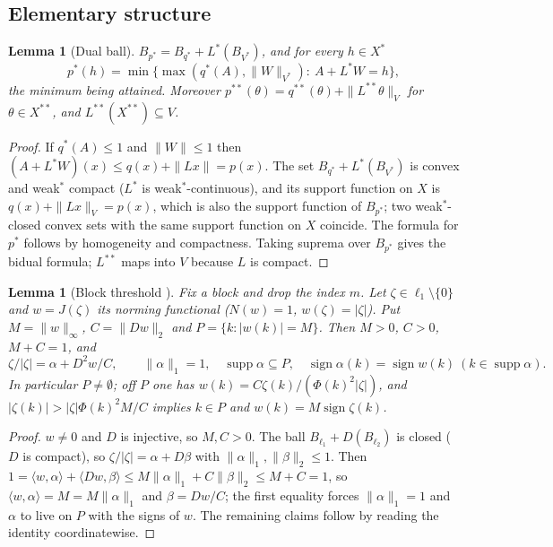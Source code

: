 \documentclass[10pt]{amsart}
\newtheorem{lemma}[theorem]{Lemma}
\theoremstyle{definition}
\theoremstyle{remark}
\newcommand{\supp}{\operatorname{supp}}
\newcommand{\sgn}{\operatorname{sign}}
\newcommand{\ip}[2]{\langle #1,#2\rangle}
\begin{document}
\subsection{Elementary structure}

\begin{lemma}[Dual ball]\label{lem:dualball}
$B_{p^*}=B_{q^*}+L^*(B_{V^*})$, and for every $h\in X^*$
\[
 p^*(h)=\min\{\max(q^*(A),\|W\|_{V^*}):\ A+L^*W=h\},
\]
the minimum being attained.  Moreover $p^{**}(\theta)=q^{**}(\theta)+
\|L^{**}\theta\|_V$ for $\theta\in X^{**}$, and $L^{**}(X^{**})\subseteq V$.
\end{lemma}

\begin{proof}
If $q^*(A)\le1$ and $\|W\|\le1$ then $(A+L^*W)(x)\le q(x)+\|Lx\|=p(x)$.
The set $B_{q^*}+L^*(B_{V^*})$ is convex and weak$^*$ compact ($L^*$ is
weak$^*$-continuous), and its support function on $X$ is
$q(x)+\|Lx\|_V=p(x)$, which is also the support function of $B_{p^*}$; two
weak$^*$-closed convex sets with the same support function on $X$
coincide.  The formula for $p^*$ follows by homogeneity and compactness.
Taking suprema over $B_{p^*}$ gives the bidual formula; $L^{**}$ maps into
$V$ because $L$ is compact.
\end{proof}

\begin{lemma}[Block threshold {\cite[Lemma~5.6]{PrB}}]\label{lem:threshold}
Fix a block and drop the index $m$.  Let $\zeta\in\ell_1\setminus\{0\}$ and
$w=J(\zeta)$ its norming functional ($N(w)=1$, $w(\zeta)=|\zeta|$).  Put
$M=\|w\|_\infty$, $C=\|Dw\|_2$ and $P=\{k:|w(k)|=M\}$.  Then $M>0$, $C>0$,
$M+C=1$, and
\[
 \zeta/|\zeta|=\alpha+D^2w/C,\qquad \|\alpha\|_1=1,\quad
 \supp\alpha\subseteq P,\quad \sgn\alpha(k)=\sgn w(k)\ (k\in\supp\alpha).
\]
In particular $P\ne\emptyset$; off $P$ one has
$w(k)=C\zeta(k)/(\Phi(k)^2|\zeta|)$, and $|\zeta(k)|>|\zeta|\Phi(k)^2M/C$
implies $k\in P$ and $w(k)=M\sgn\zeta(k)$.
\end{lemma}

\begin{proof}
$w\neq0$ and $D$ is injective, so $M,C>0$.  The ball
$B_{\ell_1}+D(B_{\ell_2})$ is closed ($D$ is compact), so
$\zeta/|\zeta|=\alpha+D\beta$ with $\|\alpha\|_1,\|\beta\|_2\le1$.  Then
$1=\ip{w}{\alpha}+\ip{Dw}{\beta}\le M\|\alpha\|_1+C\|\beta\|_2\le M+C=1$,
so $\ip{w}{\alpha}=M=M\|\alpha\|_1$ and $\beta=Dw/C$; the first equality
forces $\|\alpha\|_1=1$ and $\alpha$ to live on $P$ with the signs of $w$.
The remaining claims follow by reading the identity coordinatewise.
\end{proof}
\end{document}
